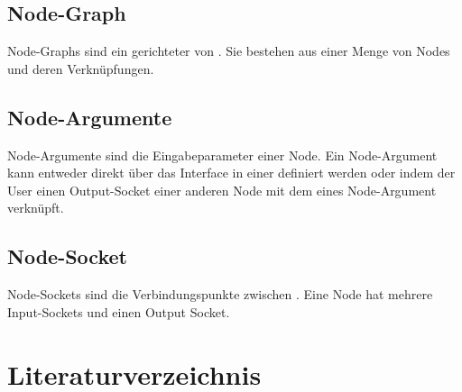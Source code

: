 \documentclass[ngerman]{article}
\begin{document}
\subsection{Node-Graph}
\label{sec:node_graph}
Node-Graphs sind ein gerichteter  von . Sie bestehen aus einer Menge von Nodes und deren Verknüpfungen. 

\subsection{Node-Argumente}
\label{sec:node_argumente}
Node-Argumente sind die Eingabeparameter einer Node. Ein Node-Argument kann entweder direkt über das Interface in einer  definiert werden oder indem der User einen Output-Socket einer anderen Node mit dem  eines Node-Argument verknüpft.

\subsection{Node-Socket}
\label{sec:node_socket}
Node-Sockets sind die Verbindungspunkte zwischen . Eine Node hat mehrere Input-Sockets und einen Output Socket.


\pagebreak
\section{Literaturverzeichnis}

\printbibliography
\end{document}
